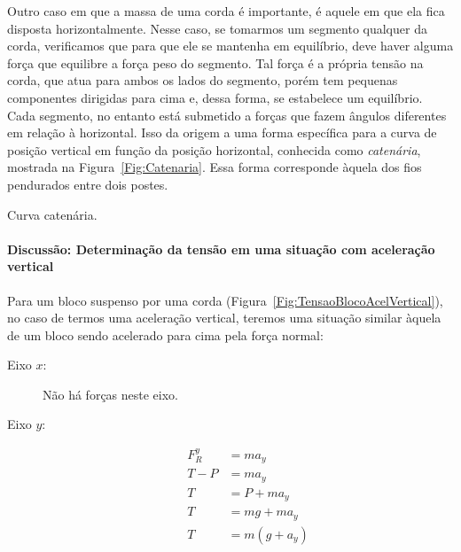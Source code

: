 Outro caso em que a massa de uma corda é importante, é aquele em que ela fica disposta horizontalmente. Nesse caso, se tomarmos um segmento qualquer da corda, verificamos que para que ele se mantenha em equilíbrio, deve haver alguma força que equilibre a força peso do segmento. Tal força é a própria tensão na corda, que atua para ambos os lados do segmento, porém tem pequenas componentes dirigidas para cima e, dessa forma, se estabelece um equilíbrio. Cada segmento, no entanto está submetido a forças que fazem ângulos diferentes em relação à horizontal. Isso da origem a uma forma específica para a curva de posição vertical em função da posição horizontal, conhecida como \emph{catenária}, mostrada na Figura~\ref{Fig:Catenaria}. Essa forma corresponde àquela dos fios pendurados entre dois postes.

\begin{marginfigure}
\centering
{}
\caption{Curva catenária.\label{Fig:Catenaria}}
\end{marginfigure}

\paragraph{Discussão: Determinação da tensão em uma situação com aceleração vertical}

Para um bloco suspenso por uma corda (Figura~\ref{Fig:TensaoBlocoAcelVertical}), no caso de termos uma aceleração vertical, teremos uma situação similar àquela de um bloco sendo acelerado para cima pela força normal:
\begin{description}
    \item[Eixo $x$:] Não há forças neste eixo.
    \item[Eixo $y$:]
        \begin{align}
            F_R^y &= m a_y \\
            T - P &= m a_y \\
            T &= P + m a_y \\
            T &= mg + m a_y \\
            T &= m (g + a_y)
        \end{align}
\end{description}

